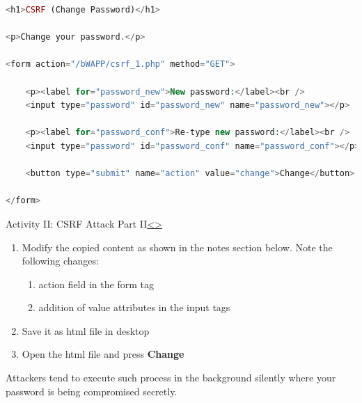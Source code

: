 \documentclass[12pt]{extarticle}
\newenvironment{instructionblock}{\Large\bgroup}{\egroup}
\begin{document}
\begin{lstlisting}[basicstyle=\small, language=php, breaklines=true]
<h1>CSRF (Change Password)</h1>

<p>Change your password.</p>

<form action="/bWAPP/csrf_1.php" method="GET">

	<p><label for="password_new">New password:</label><br />
	<input type="password" id="password_new" name="password_new"></p>

	<p><label for="password_conf">Re-type new password:</label><br />
	<input type="password" id="password_conf" name="password_conf"></p>  

	<button type="submit" name="action" value="change">Change</button>   

</form>
\end{lstlisting}




\pagebreak
\begin{slide}{Activity II: CSRF Attack Part II}{\hyperref[slide 15]{\textless}\hyperref[slide 17]{\textgreater}}
	\begin{instructionblock}
		
		\begin{enumerate}
			\item Modify the copied content as shown in the notes section below. Note the following changes:
			\begin{enumerate}
				\item action field in the form tag
				\item addition of value attributes in the input tags
			\end{enumerate}
			\item Save it as html file in desktop
			\item Open the html file and press \textbf{Change}
		\end{enumerate}
		Attackers tend to execute such process in the background silently where your password is being compromised secretly.
	\end{instructionblock}	
\end{slide}

\vspace{2mm}
\noindent 
\vfill
\end{document}
